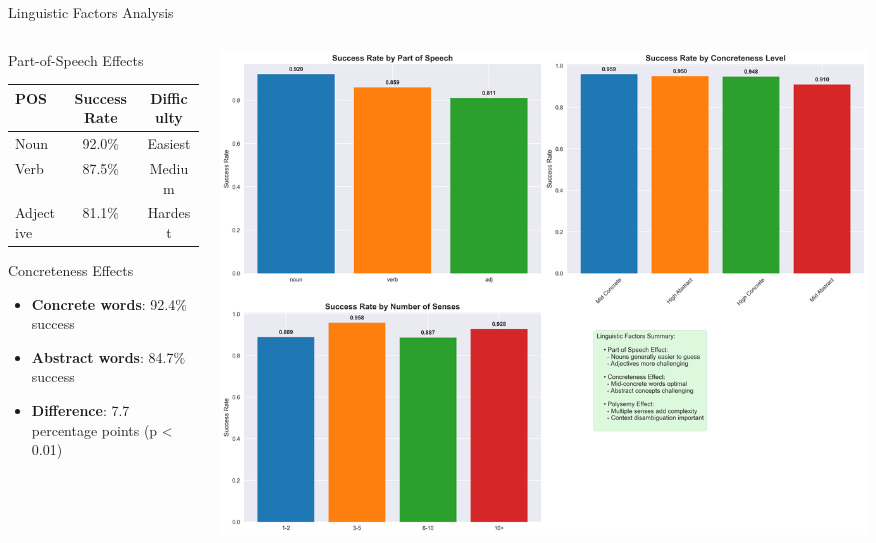 \documentclass[aspectratio=169]{beamer}
\begin{document}
\begin{frame}{Linguistic Factors Analysis}
\begin{columns}[c]
\begin{column}{0.5\textwidth}
\begin{block}{Part-of-Speech Effects}
\begin{center}
\begin{tabular}{lcc}
\toprule
\textbf{POS} & \textbf{Success Rate} & \textbf{Difficulty} \\
\midrule
Noun & 92.0\% & Easiest \\
Verb & 87.5\% & Medium \\
Adjective & 81.1\% & Hardest \\
\bottomrule
\end{tabular}
\end{center}
\end{block}

\begin{block}{Concreteness Effects}
\begin{itemize}
    \item \textbf{Concrete words}: 92.4\% success
    \item \textbf{Abstract words}: 84.7\% success
    \item \textbf{Difference}: 7.7 percentage points (p < 0.01)
\end{itemize}
\end{block}
\end{column}

\begin{column}{0.48\textwidth}
\begin{center}
\includegraphics[width=\textwidth]{comprehensive_figures/figure3_linguistic.png}
\end{center}
\end{column}
\end{columns}
\end{frame}
\end{document}
